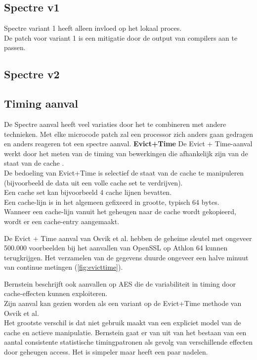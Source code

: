 \subsection{Spectre v1}
Spectre variant 1 heeft alleen invloed op het lokaal proces.\\
De patch voor variant 1 is een mitigatie door de output van compilers aan te passen.


\subsection{Spectre v2}

\subsection{Timing aanval}
De Spectre aanval heeft veel variaties door het te combineren met andere technieken.
Met elke microcode patch zal een processor zich anders gaan gedragen en anders reageren tot een spectre aanval.
\textbf{Evict+Time}
De Evict + Time-aanval werkt door
het meten van de timing van bewerkingen die afhankelijk zijn van de
staat van de cache \parencite{Osvik2006}.\\
De bedoeling van Evict+Time is selectief de staat van de cache te manipuleren (bijvoorbeeld de data uit een volle cache set te verdrijven).\\
Een cache set kan bijvoorbeeld 4 cache lijnen bevatten.\\
Een cache-lijn is in het algemeen gefixeerd in grootte, typisch 64 bytes.\\
Wanneer een cache-lijn vanuit het geheugen naar de cache wordt gekopieerd, wordt er een cache-entry aangemaakt.

De Evict + Time aanval van Osvik et al. \parencite{Osvik2006} hebben de geheime sleutel met ongeveer 500.000
voorbeelden bij het aanvallen van OpenSSL op Athlon 64 kunnen terugkrijgen. Het verzamelen van de gegevens duurde ongeveer een halve minuut van continue metingen (\ref{fig:evicttime}).

Bernstein \parencite{Bernstein2005} beschrijft ook aanvallen op AES
die de variabiliteit in timing door cache-effecten kunnen exploiteren.\\
Zijn aanval kan gezien worden als een variant op de Evict+Time methode van Osvik et al.\\
Het grootste verschil is dat \parencite{Bernstein2005} niet gebruik maakt van 
een expliciet model van de cache en actieve manipulatie. Bernstein gaat er van uit van het bestaan van
een aantal consistente statistische timingpatronen als gevolg van verschillende effecten door geheugen access.
Het is simpeler maar heeft een paar nadelen.

